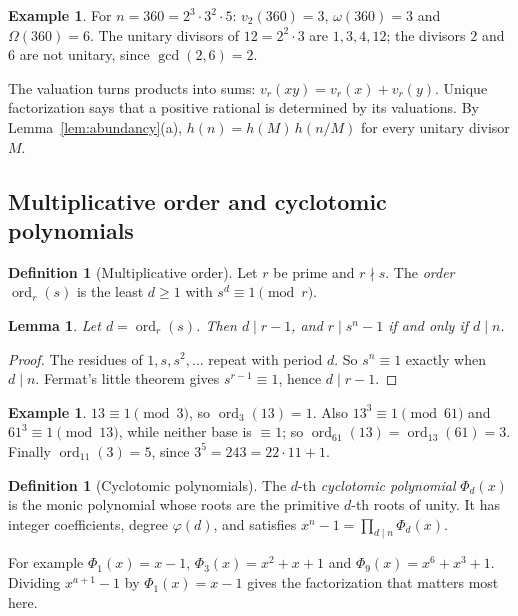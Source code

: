 \documentclass[11pt]{article}
\newtheorem{lemma}[theorem]{Lemma}
\theoremstyle{definition}
\newtheorem{definition}[theorem]{Definition}
\newtheorem{example}[theorem]{Example}
\theoremstyle{remark}
\DeclareMathOperator{\ord}{ord}
\begin{document}
\begin{example}
For $n=360=2^3\cdot3^2\cdot5$: $v_2(360)=3$, $\omega(360)=3$ and
$\Omega(360)=6$.  The unitary divisors of $12=2^2\cdot3$ are $1,3,4,12$;
the divisors $2$ and $6$ are not unitary, since $\gcd(2,6)=2$.
\end{example}

The valuation turns products into sums: $v_r(xy)=v_r(x)+v_r(y)$.  Unique
factorization says that a positive rational is determined by its valuations.
By Lemma~\ref{lem:abundancy}(a), $h(n)=h(M)\,h(n/M)$ for every unitary divisor
$M$.

\subsection{Multiplicative order and cyclotomic polynomials}\label{sec:order}

\begin{definition}[Multiplicative order]
Let $r$ be prime and $r\nmid s$.  The \emph{order} $\ord_r(s)$ is the least
$d\ge1$ with $s^d\equiv1\pmod r$.
\end{definition}

\begin{lemma}\label{lem:order}
Let $d=\ord_r(s)$.  Then $d\mid r-1$, and $r\mid s^n-1$ if and only if
$d\mid n$.
\end{lemma}

\begin{proof}
The residues of $1,s,s^2,\dots$ repeat with period $d$.  So $s^n\equiv1$
exactly when $d\mid n$.  Fermat's little theorem gives $s^{r-1}\equiv1$,
hence $d\mid r-1$.
\end{proof}

\begin{example}
$13\equiv1\pmod3$, so $\ord_3(13)=1$.  Also $13^3\equiv1\pmod{61}$ and
$61^3\equiv1\pmod{13}$, while neither base is $\equiv1$; so
$\ord_{61}(13)=\ord_{13}(61)=3$.  Finally $\ord_{11}(3)=5$, since
$3^5=243=22\cdot11+1$.
\end{example}

\begin{definition}[Cyclotomic polynomials]
The $d$-th \emph{cyclotomic polynomial} $\Phi_d(x)$ is the monic polynomial
whose roots are the primitive $d$-th roots of unity.  It has integer
coefficients, degree $\varphi(d)$, and satisfies
$x^n-1=\prod_{d\mid n}\Phi_d(x)$.
\end{definition}

For example $\Phi_1(x)=x-1$, $\Phi_3(x)=x^2+x+1$ and
$\Phi_9(x)=x^6+x^3+1$.  Dividing $x^{a+1}-1$ by $\Phi_1(x)=x-1$ gives the
factorization that matters most here.
\end{document}
